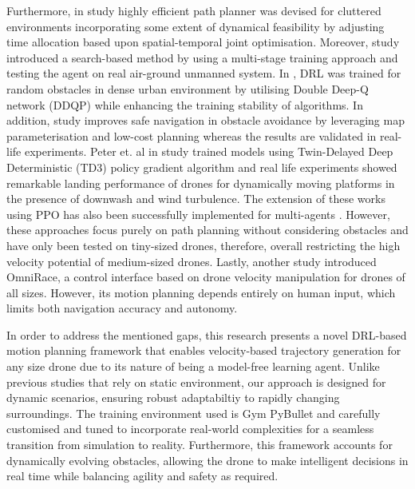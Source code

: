 Furthermore, in study \cite{flyingswarm} highly efficient path planner was devised for cluttered environments incorporating some extent of dynamical feasibility by adjusting time allocation based upon spatial-temporal joint optimisation. Moreover, study \cite{searchbasedapp13042244} introduced a search-based method by using a multi-stage training approach and testing the agent on real air-ground unmanned system. In \cite{denseurbanen17112762}, DRL was trained for random obstacles in dense urban environment by utilising Double Deep-Q network (DDQP) while enhancing the training stability of algorithms. In addition, study \cite{mapparams} improves safe navigation in obstacle avoidance by leveraging map parameterisation and low-cost planning whereas the results are validated in real-life experiments. Peter et. al in study \cite{landeraiadaptivelandingbehavior} trained models using Twin-Delayed Deep Deterministic (TD3) policy gradient algorithm and real life experiments showed remarkable landing performance of drones for dynamically moving platforms in the presence of downwash and wind turbulence. The extension of these works using PPO has also been successfully implemented for multi-agents \cite{marlanderlocalpathplanning}. However, these approaches focus purely on path planning without considering obstacles and have only been tested on tiny-sized drones, therefore, overall restricting the high velocity potential of medium-sized drones. Lastly, another study \cite{omnirace6dhandpose} introduced OmniRace, a control interface based on drone velocity manipulation for drones of all sizes. However, its motion planning depends entirely on human input, which limits both navigation accuracy and autonomy.

In order to address the mentioned gaps, this research presents a novel DRL-based motion planning framework that enables velocity-based trajectory generation for any size drone due to its nature of being a model-free learning agent. Unlike previous studies that rely on static environment, our approach is designed for dynamic scenarios, ensuring robust adaptabiltiy to rapidly changing surroundings. The training environment used is Gym PyBullet \cite{panerati2021learning} and carefully customised and tuned to incorporate real-world complexities for a seamless transition from simulation to reality. Furthermore, this framework accounts for dynamically evolving obstacles, allowing the drone to make intelligent decisions in real time while balancing agility and safety as required.